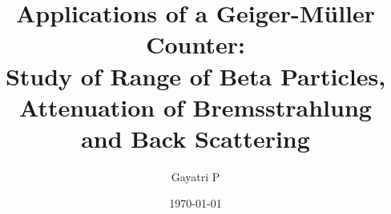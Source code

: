 \documentclass[reprint,amsmath,amssymb,aps, margin=1in]{revtex4-2}
\begin{document}
    \title{Applications of a Geiger-M{\"u}ller Counter:\\Study of Range of Beta Particles, Attenuation of Bremsstrahlung\\and Back Scattering}

    \author{Gayatri P}
    \date{\today}

    
    \maketitle

    
    
    

    
    \nocite{*}
\end{document}
